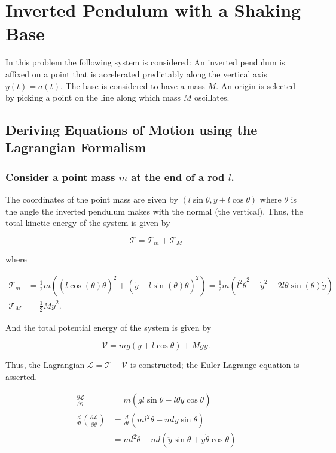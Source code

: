 \section{Inverted Pendulum with a Shaking Base}
In this problem the following system is considered: An inverted pendulum is affixed on a point that is accelerated predictably along the vertical axis $\ddot{y}(t) = a(t)$. The base is considered to have a mass $M$. An origin is selected by picking a point on the line along which mass $M$ oscillates.

\subsection{Deriving Equations of Motion using the Lagrangian Formalism}

\subsubsection{Consider a point mass $m$ at the end of a rod $l$.}
The coordinates of the point mass are given by $(l\sin\theta, y + l\cos\theta)$ where $\theta$ is the angle the inverted pendulum makes with the normal (the vertical). Thus, the total kinetic energy of the system is given by

\begin{equation}
    \mathcal{T} = \mathcal{T}_m + \mathcal{T}_M
\end{equation}

where

\begin{align}
    \mathcal{T}_m &= \frac{1}{2}m \left(
        (l\cos(\theta) \dot\theta)^2 +
        \left( \dot{y} - l\sin(\theta) \dot\theta \right)^2
        \right) =
        \frac{1}{2}m \left( l^2\dot\theta^2 + \dot{y}^2 - 2l\dot\theta \sin(\theta)\dot{y} \right) \\
    \mathcal{T}_M &= \frac{1}{2}M \dot{y}^2.
\end{align}

And the total potential energy of the system is given by

\begin{equation}
    \mathcal{V} = mg\left(y + l\cos\theta\right) + Mgy.
\end{equation}

Thus, the Lagrangian $\mathcal{L} = \mathcal{T} - \mathcal{V}$ is constructed; the Euler-Lagrange equation is asserted.

\begin{align}
    \frac{\partial \mathcal{L}}{\partial \theta} &=
        m \left(
            gl\sin\theta - l\dot\theta \dot{y}\cos\theta
        \right) \\
    \frac{d}{dt} \left( \frac{\partial \mathcal{L}}{\partial \dot{\theta}} \right) &=
        \frac{d}{dt} \left(
            ml^2\dot{\theta} - ml\dot{y}\sin\theta
        \right) \nonumber \\
        &= ml^2\ddot\theta - ml\left( \ddot{y}\sin\theta + \dot{y}\dot\theta\cos\theta \right)
\end{align}

